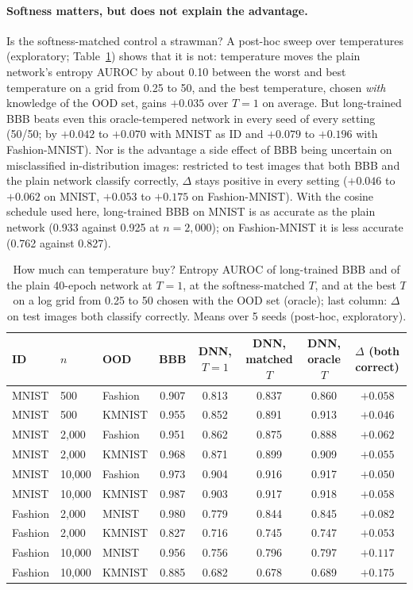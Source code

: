 \documentclass[10pt]{article}
\begin{document}
\paragraph{Softness matters, but does not explain the advantage.} Is the
softness-matched control a strawman? A post-hoc sweep over temperatures
(exploratory; Table~\ref{tab:sweep}) shows that it is not: temperature moves the
plain network's entropy AUROC by about 0.10 between the worst and best
temperature on a grid from 0.25 to 50, and the best temperature, chosen
\emph{with} knowledge of the OOD set, gains $+0.035$ over $T=1$ on average. But
long-trained BBB beats even this oracle-tempered network in every seed of every
setting (50/50; by $+0.042$ to $+0.070$ with MNIST as ID and $+0.079$ to $+0.196$
with Fashion-MNIST). Nor is the advantage a side effect of BBB being uncertain
on misclassified in-distribution images: restricted to test images that both
BBB and the plain network classify correctly, $\Delta$ stays positive in every
setting ($+0.046$ to $+0.062$ on MNIST, $+0.053$ to $+0.175$ on Fashion-MNIST).
With the cosine schedule used here, long-trained BBB on MNIST is as accurate as
the plain network (0.933 against 0.925 at $n=2{,}000$); on Fashion-MNIST it is
less accurate (0.762 against 0.827).

\begin{table}[!htb]
\centering\small
\caption{How much can temperature buy? Entropy AUROC of long-trained BBB and of
the plain 40-epoch network at $T=1$, at the softness-matched $T$, and at the
best $T$ on a log grid from 0.25 to 50 chosen with the OOD set (oracle); last
column: $\Delta$ on test images both classify correctly. Means over 5 seeds
(post-hoc, exploratory).}
\label{tab:sweep}
\begin{tabular}{lllccccc}
\toprule
ID & $n$ & OOD & BBB & DNN, $T=1$ & DNN, matched $T$ & DNN, oracle $T$ & $\Delta$ (both correct) \\
\midrule
MNIST & 500 & Fashion & 0.907 & 0.813 & 0.837 & 0.860 & $+0.058$ \\
MNIST & 500 & KMNIST & 0.955 & 0.852 & 0.891 & 0.913 & $+0.046$ \\
MNIST & 2{,}000 & Fashion & 0.951 & 0.862 & 0.875 & 0.888 & $+0.062$ \\
MNIST & 2{,}000 & KMNIST & 0.968 & 0.871 & 0.899 & 0.909 & $+0.055$ \\
MNIST & 10{,}000 & Fashion & 0.973 & 0.904 & 0.916 & 0.917 & $+0.050$ \\
MNIST & 10{,}000 & KMNIST & 0.987 & 0.903 & 0.917 & 0.918 & $+0.058$ \\
Fashion & 2{,}000 & MNIST & 0.980 & 0.779 & 0.844 & 0.845 & $+0.082$ \\
Fashion & 2{,}000 & KMNIST & 0.827 & 0.716 & 0.745 & 0.747 & $+0.053$ \\
Fashion & 10{,}000 & MNIST & 0.956 & 0.756 & 0.796 & 0.797 & $+0.117$ \\
Fashion & 10{,}000 & KMNIST & 0.885 & 0.682 & 0.678 & 0.689 & $+0.175$ \\
\bottomrule
\end{tabular}
\end{table}
\end{document}
